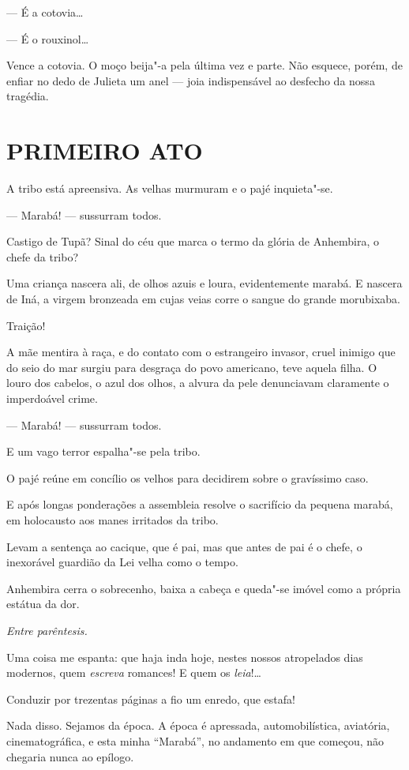 --- É a cotovia\ldots{}

--- É o rouxinol\ldots{}

Vence a cotovia. O moço beija"-a pela última vez e parte. Não esquece,
porém, de enfiar no dedo de Julieta um anel --- joia indispensável ao
desfecho da nossa tragédia.

\section*{PRIMEIRO ATO}

A tribo está apreensiva. As velhas murmuram e o pajé inquieta"-se.

--- Marabá! --- sussurram todos.

Castigo de Tupã? Sinal do céu que marca o termo da glória de Anhembira,
o chefe da tribo?

Uma criança nascera ali, de olhos azuis e loura, evidentemente marabá. E
nascera de Iná, a virgem bronzeada em cujas veias corre o sangue do
grande morubixaba.

Traição!

A mãe mentira à raça, e do contato com o estrangeiro invasor, cruel
inimigo que do seio do mar surgiu para desgraça do povo americano, teve
aquela filha. O louro dos cabelos, o azul dos olhos, a alvura da pele
denunciavam claramente o imperdoável crime.

--- Marabá! --- sussurram todos.

E um vago terror espalha"-se pela tribo.

O pajé reúne em concílio os velhos para decidirem sobre o gravíssimo
caso.

E após longas ponderações a assembleia resolve o sacrifício da pequena
marabá, em holocausto aos manes irritados da tribo.

Levam a sentença ao cacique, que é pai, mas que antes de pai é o chefe,
o inexorável guardião da Lei velha como o tempo.

Anhembira cerra o sobrecenho, baixa a cabeça e queda"-se imóvel como a
própria estátua da dor.

\emph{Entre parêntesis.}

Uma coisa me espanta: que haja inda hoje, nestes nossos atropelados dias
modernos, quem \emph{escreva} romances! E quem os \emph{leia}!\ldots{}

Conduzir por trezentas páginas a fio um enredo, que estafa!

Nada disso. Sejamos da época. A época é apressada, automobilística,
aviatória, cinematográfica, e esta minha ``Marabá'', no andamento em que
começou, não chegaria nunca ao epílogo.

